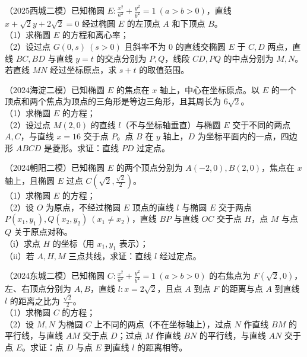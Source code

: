 \begin{example} %
（2025西城二模）已知椭圆 $E:\frac{x^2}{a^2}+\frac{y^2}{b^2}=1\ (a>b>0)$，直线 $x+\sqrt{2}y+2\sqrt{2}=0$ 经过椭圆 $E$ 的左顶点 $A$ 和下顶点 $B$。\\
（1）求椭圆 $E$ 的方程和离心率；\\
（2）设过点 $G(0,s)\ (s>0)$ 且斜率不为 $0$ 的直线交椭圆 $E$ 于 $C,D$ 两点，直线 $BC,BD$ 与直线 $y=t$ 的交点分别为 $P,Q$，线段 $CD,PQ$ 的中点分别为 $M,N$。若直线 $MN$ 经过坐标原点，求 $s+t$ 的取值范围。
\end{example}

\begin{example} %
（2024海淀二模）已知椭圆 $E$ 的焦点在 $x$ 轴上，中心在坐标原点。以 $E$ 的一个顶点和两个焦点为顶点的三角形是等边三角形，且其周长为 $6\sqrt{2}$。\\
（1）求椭圆 $E$ 的方程；\\
（2）设过点 $M(2,0)$ 的直线 $l$（不与坐标轴垂直）与椭圆 $E$ 交于不同的两点 $A,C$，与直线 $x=16$ 交于点 $P$。点 $B$ 在 $y$ 轴上，$D$ 为坐标平面内的一点，四边形 $ABCD$ 是菱形。求证：直线 $PD$ 过定点。
\end{example}

\begin{example} %
（2024朝阳二模）已知椭圆 $E$ 的两个顶点分别为 $A(-2,0),B(2,0)$，焦点在 $x$ 轴上，且椭圆 $E$ 过点 $C\left(\sqrt{2},\frac{\sqrt{2}}{2}\right)$。\\
（1）求椭圆 $E$ 的方程；\\
（2）设 $O$ 为原点，不经过椭圆 $E$ 顶点的直线 $l$ 与椭圆 $E$ 交于两点 $P(x_1,y_1),Q(x_2,y_2)\ (x_1\neq x_2)$，直线 $BP$ 与直线 $OC$ 交于点 $H$，点 $M$ 与点 $Q$ 关于原点对称。\\
（i）求点 $H$ 的坐标（用 $x_1,y_1$ 表示）；\\
（ii）若 $A,H,M$ 三点共线，求证：直线 $l$ 经过定点。
\end{example}

\begin{example} %
（2024东城二模）已知椭圆 $C:\frac{x^2}{a^2}+\frac{y^2}{b^2}=1\ (a>b>0)$ 的右焦点为 $F(\sqrt{2},0)$，左、右顶点分别为 $A,B$，直线 $l:x=2\sqrt{2}$，且点 $A$ 到点 $F$ 的距离与点 $A$ 到直线 $l$ 的距离之比为 $\frac{\sqrt{2}}{2}$。\\
（1）求椭圆 $C$ 的方程；\\
（2）设 $M,N$ 为椭圆 $C$ 上不同的两点（不在坐标轴上），过点 $N$ 作直线 $BM$ 的平行线，与直线 $AM$ 交于点 $D$；过点 $M$ 作直线 $BN$ 的平行线，与直线 $AN$ 交于点 $E$。求证：点 $D$ 与点 $E$ 到直线 $l$ 的距离相等。
\end{example}

